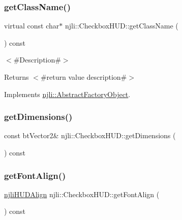 \mbox{\label{classnjli_1_1_checkbox_h_u_d_a51763018df640c7b4a4d674ba6bf2cfa}} 
\subsubsection{\texorpdfstring{get\+Class\+Name()}{getClassName()}}
{\footnotesize\ttfamily virtual const char$\ast$ njli\+::\+Checkbox\+H\+U\+D\+::get\+Class\+Name (\begin{DoxyParamCaption}{ }\end{DoxyParamCaption}) const\hspace{0.3cm}{\ttfamily [virtual]}}

$<$\#\+Description\#$>$

\begin{DoxyReturn}{Returns}
$<$\#return value description\#$>$ 
\end{DoxyReturn}


Implements \mbox{\hyperlink{classnjli_1_1_abstract_factory_object_af4151e41b80d5bc3fc42822c67fc2278}{njli\+::\+Abstract\+Factory\+Object}}.

\mbox{\label{classnjli_1_1_checkbox_h_u_d_aeb52009f01f539521dc28b4db919a148}} 
\subsubsection{\texorpdfstring{get\+Dimensions()}{getDimensions()}}
{\footnotesize\ttfamily const bt\+Vector2\& njli\+::\+Checkbox\+H\+U\+D\+::get\+Dimensions (\begin{DoxyParamCaption}{ }\end{DoxyParamCaption}) const}

\mbox{\label{classnjli_1_1_checkbox_h_u_d_a92870d62459f239e7866f9fbf32757a9}} 
\subsubsection{\texorpdfstring{get\+Font\+Align()}{getFontAlign()}}
{\footnotesize\ttfamily \mbox{\hyperlink{namespacenjli_a376c3102aef4710f2b54a545bf0e2b3a}{njli\+H\+U\+D\+Align}} njli\+::\+Checkbox\+H\+U\+D\+::get\+Font\+Align (\begin{DoxyParamCaption}{ }\end{DoxyParamCaption}) const}


